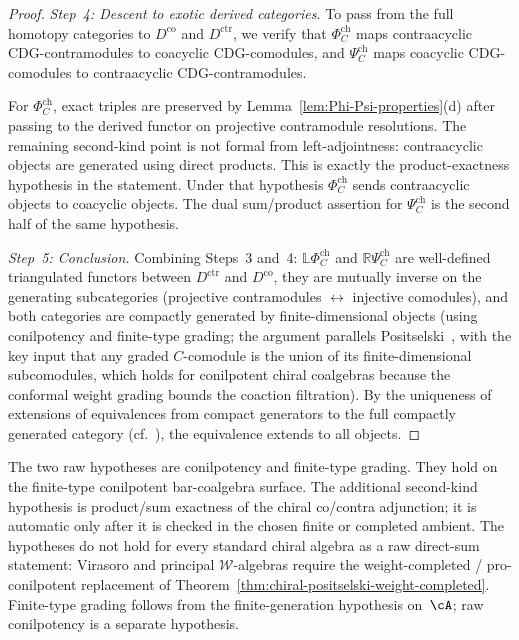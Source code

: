 \begin{proof}
\emph{Step~4: Descent to exotic derived categories.}
To pass from the full homotopy categories to $D^{\mathrm{co}}$ and
$D^{\mathrm{ctr}}$, we verify that $\Phi_C^{\mathrm{ch}}$ maps
contraacyclic CDG-contramodules to coacyclic CDG-comodules, and
$\Psi_C^{\mathrm{ch}}$ maps coacyclic CDG-comodules to
contraacyclic CDG-contramodules.

For $\Phi_C^{\mathrm{ch}}$, exact triples are preserved by
Lemma~\ref{lem:Phi-Psi-properties}(d) after passing to the derived
functor on projective contramodule resolutions. The remaining
second-kind point is not formal from left-adjointness: contraacyclic
objects are generated using direct products. This is exactly the
product-exactness hypothesis in the statement. Under that hypothesis
$\Phi_C^{\mathrm{ch}}$ sends contraacyclic objects to coacyclic
objects. The dual sum/product assertion for $\Psi_C^{\mathrm{ch}}$
is the second half of the same hypothesis.

\emph{Step~5: Conclusion.}
Combining Steps~3 and~4: $\mathbb{L}\Phi_C^{\mathrm{ch}}$ and
$\mathbb{R}\Psi_C^{\mathrm{ch}}$ are well-defined triangulated
functors between $D^{\mathrm{ctr}}$ and $D^{\mathrm{co}}$, they
are mutually inverse on the generating subcategories (projective
contramodules $\leftrightarrow$ injective comodules), and both
categories are compactly generated by finite-dimensional objects
(using conilpotency and finite-type grading; the argument parallels
Positselski~\cite[\S5.5]{Positselski11}, with the key input that any
graded $C$-comodule is the union of its finite-dimensional
subcomodules, which holds for conilpotent chiral coalgebras because
the conformal weight grading bounds the coaction filtration).
By the uniqueness of extensions of equivalences from compact generators
to the full compactly generated category
(cf.~\cite[\S5.5]{Positselski11}), the equivalence extends to all objects.
\end{proof}

\begin{remark}[Hypotheses]\label{rem:co-contra-hypotheses}
The two raw hypotheses are conilpotency and finite-type grading. They
hold on the finite-type conilpotent bar-coalgebra surface. The
additional second-kind hypothesis is product/sum exactness of the
chiral co/contra adjunction; it is automatic only after it is checked
in the chosen finite or completed ambient. The hypotheses do not
hold for every standard chiral algebra as a raw direct-sum statement:
Virasoro and principal $\mathcal W$-algebras require the
weight-completed / pro-conilpotent replacement of
Theorem~\ref{thm:chiral-positselski-weight-completed}. Finite-type
grading follows from the finite-generation hypothesis on~$\cA$; raw
conilpotency is a separate hypothesis.
\end{remark}

